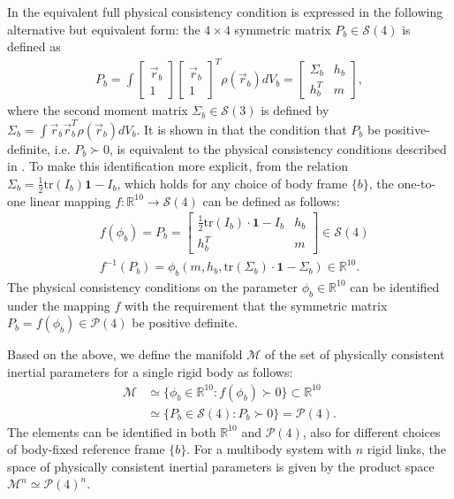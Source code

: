\documentclass[letterpaper, 10 pt, conference]{ieeeconf}  %
\begin{document}
In \cite{Wensing_RAL} the equivalent full physical consistency condition is expressed in the following
alternative but equivalent form: the $4 \times 4$ symmetric matrix $P_{b} \in \mathcal{S}(4)$ 
is defined as 
\begin{eqnarray}
P_{b} = \int \left[\begin{array}{c} \vec{r}_{b} \\ 1 \end{array}\right]
  \left[\begin{array}{c} \vec{r}_{b} \\ 1 \end{array}\right]^{T} \rho(\vec{r}_b) dV_{b} 
= \left[\begin{array}{cc} \Sigma_{b} & h_{b} \\ h_{b}^{T} & m \end{array}\right],
\label{44psd}
\end{eqnarray}
where the second moment matrix $\Sigma_{b}\in \mathcal{S}(3)$ is defined by
$\Sigma_{b} = \int \vec{r}_{b}\vec{r}_{b}^{T} \rho(\vec{r}_{b})dV_{b}$.  It is shown
in \cite{Wensing_RAL} that the condition that $P_b$ be positive-definite, i.e. $P_b \succ 0$,
is equivalent to the physical consistency conditions described in \cite{Traversaro_IROS}.
To make this identification more explicit, from the relation $\Sigma_{b}
= \frac{1}{2}\mathrm{tr}(I_{b})\mathbf{1} - I_{b}$, which holds for any choice of
body frame $\{b\}$, the one-to-one linear mapping $f : \mathbb{R}^{10}
\rightarrow \mathcal{S}(4)$ can be defined as follows:
\begin{align*}
&f(\phi_{b}) = P_{b} = \left[\begin{array}{cc} \frac{1}{2}\mathrm{tr}(I_{b})
\cdot\mathbf{1} - I_{b} & h_{b} \\ h_{b}^{T} & m\end{array}\right] \in \mathcal{S}(4)\\
&f^{-1}(P_{b}) = \phi_{b}(m, h_{b}, \mathrm{tr}(\Sigma_{b})\cdot\mathbf{1}
- \Sigma_{b}) \in \mathbb{R}^{10}.
\end{align*}
The physical consistency conditions on the  parameter $\phi_{b} \in \mathbb{R}^{10}$
can be identified under the mapping $f$ with the requirement that the symmetric matrix
$P_{b} = f(\phi_b) \in \mathcal{P}(4)$ be positive definite.

Based on the above, we define the manifold $\mathcal{M}$ of the set of physically consistent
inertial parameters for a single rigid body as follows:
\begin{align*}
\mathcal{M} &\simeq \{ \phi_{b} \in \mathbb{R}^{10} : f(\phi_{b}) \succ 0\}
\subset\mathbb{R}^{10}\nonumber\\
& \simeq \{ P_{b} \in \mathcal{S}(4) : P_{b} \succ 0\} = \mathcal{P}(4).
\end{align*}
The elements can be identified in both $\mathbb{R}^{10}$ and $\mathcal{P}(4)$, also
for different choices of body-fixed reference frame $\{b\}$. For a multibody system
with $n$ rigid links, the space of physically consistent inertial parameters is
given by the product space $\mathcal{M}^{n} \simeq \mathcal{P}(4)^{n}$.
\end{document}
